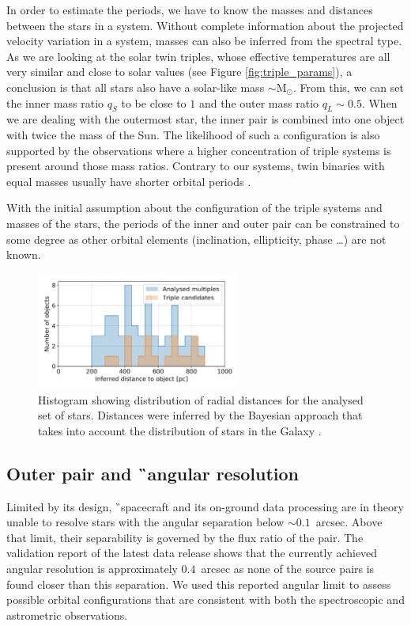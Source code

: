 In order to estimate the periods, we have to know the masses and distances between the stars in a system. Without complete information about the projected velocity variation in a system, masses can also be inferred from the spectral type. As we are looking at the solar twin triples, whose effective temperatures are all very similar and close to solar values (see Figure \ref{fig:triple_params}), a conclusion is that all stars also have a solar-like mass $\sim$M$_{\odot}$. From this, we can set the inner mass ratio $q_S$ to be close to $1$ and the outer mass ratio $q_L \sim 0.5$. When we are dealing with the outermost star, the inner pair is combined into one object with twice the mass of the Sun. The likelihood of such a configuration is also supported by the observations \cite{2008MNRAS.389..925T} where a higher concentration of triple systems is present around those mass ratios. Contrary to our systems, twin binaries with equal masses usually have shorter orbital periods \cite{2000A&A...360..997T}. 

With the initial assumption about the configuration of the triple systems and masses of the stars, the periods of the inner and outer pair can be constrained to some degree as other orbital elements (inclination, ellipticity, phase \ldots) are not known.

\begin{figure}
	\centering
	\includegraphics[width=0.6\textwidth]{dist_pc.png}
	\caption{Histogram showing distribution of radial distances for the analysed set of stars. Distances were inferred by the Bayesian approach that takes into account the distribution of stars in the Galaxy \cite{2018AJ....156...58B}.}
	\label{fig:gaia_dist}
\end{figure}

\subsection{Outer pair and \G\ angular resolution}
\label{sec:orbits_gaia}
Limited by its design, \G\ spacecraft and its on-ground data processing are in theory unable to resolve stars with the angular separation below $\sim0.1$~arcsec. Above that limit, their separability is governed by the flux ratio of the pair. The validation report of the latest data release \cite{2018A&A...616A..17A} shows that the currently achieved angular resolution is approximately $0.4$~arcsec as none of the source pairs is found closer than this separation. We used this reported angular limit to assess possible orbital configurations that are consistent with both the spectroscopic and astrometric observations.

